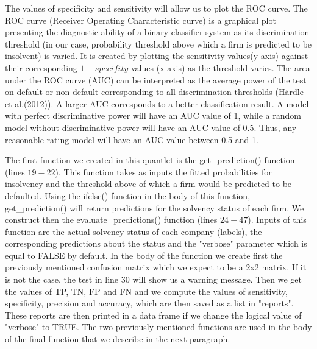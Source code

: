\documentclass[11pt]{article}
\begin{document}
The values of specificity and sensitivity will allow us to plot the ROC curve. The ROC curve (Receiver Operating Characteristic curve) is a graphical plot presenting the diagnostic ability of a binary classifier system as its discrimination threshold (in our case, probability threshold above which a firm is predicted to be insolvent) is varied. It is created by plotting the sensitivity values(y axis) against their corresponding $1-specifity$ values (x axis) as the threshold varies. The area under the ROC curve (AUC) can be interpreted as the average power of the test on default or non-default corresponding to all discrimination thresholds (H\"ardle et al.(2012)). A larger  AUC corresponds to a better classification result. A model with perfect discriminative power will have an AUC value of 1, while a random model without discriminative power will have an AUC value of 0.5. Thus, any reasonable rating model will have an AUC value between 0.5 and 1.  

The first function we created in this quantlet is the get\_prediction() function (lines $19-22$). This function takes as inputs the fitted probabilities for insolvency and the threshold above of which a firm would be predicted to be defaulted. Using the ifelse() function in the body of this function, get\_prediction() will return predictions for the solvency status of each firm. We construct then the evaluate\_predictions() function (lines $24-47$). Inputs of this function are the actual solvency status of each company (labels), the corresponding predictions about the status and the "verbose" parameter which is equal to FALSE by default. In the body of the function we create first the previously mentioned confusion matrix which we expect to be a 2x2 matrix. If it is not the case, the test in line 30 will show us a warning message. Then we get the values of TP, TN, FP and FN and we compute the values of sensitivity, specificity, precision and accuracy, which are then saved as a list in "reports". These reports are then printed in a data frame if we change the logical value of "verbose" to TRUE. The two previously mentioned functions are used in the body of the final function that we describe in the next paragraph. 
\end{document}
